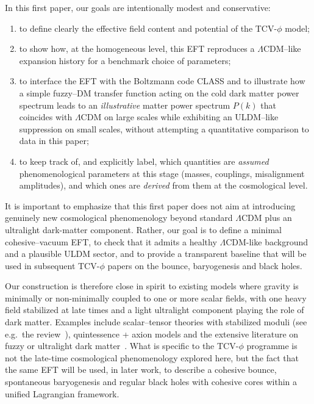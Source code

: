 \documentclass[aps,prd,onecolumn,nofootinbib,superscriptaddress]{revtex4-2}
\begin{document}
In this first paper, our goals are intentionally modest and conservative:
\begin{enumerate}[label=(\roman*),leftmargin=1.5em]
  \item to define clearly the effective field content and potential of the TCV-$\phi$ model;
  \item to show how, at the homogeneous level, this EFT reproduces a $\Lambda$CDM--like expansion history for a benchmark choice of parameters;
  \item to interface the EFT with the Boltzmann code CLASS and to illustrate how a simple fuzzy--DM transfer function acting on the cold dark matter power spectrum leads to an \emph{illustrative} matter power spectrum $P(k)$ that coincides with $\Lambda$CDM on large scales while exhibiting an ULDM--like suppression on small scales, without attempting a quantitative comparison to data in this paper;
  \item to keep track of, and explicitly label, which quantities are \emph{assumed} phenomenological parameters at this stage (masses, couplings, misalignment amplitudes), and which ones are \emph{derived} from them at the cosmological level.
\end{enumerate}

It is important to emphasize that this first paper does not aim at introducing genuinely new cosmological phenomenology beyond standard $\Lambda$CDM plus an ultralight dark-matter component. Rather, our goal is to define a minimal cohesive--vacuum EFT, to check that it admits a healthy $\Lambda$CDM-like background and a plausible ULDM sector, and to provide a transparent baseline that will be used in subsequent TCV-$\phi$ papers on the bounce, baryogenesis and black holes.

Our construction is therefore close in spirit to existing models where gravity is minimally or non-minimally coupled to one or more scalar fields, with one heavy field stabilized at late times and a light ultralight component playing the role of dark matter. Examples include scalar--tensor theories with stabilized moduli (see e.g.\ the review~\cite{Clifton2012}), quintessence + axion models and the extensive literature on fuzzy or ultralight dark matter~\cite{ULDM,Hui2017,Marsh2016,Schive2014}. What is specific to the TCV-$\phi$ programme is not the late-time cosmological phenomenology explored here, but the fact that the same EFT will be used, in later work, to describe a cohesive bounce, spontaneous baryogenesis and regular black holes with cohesive cores within a unified Lagrangian framework.
\end{document}
